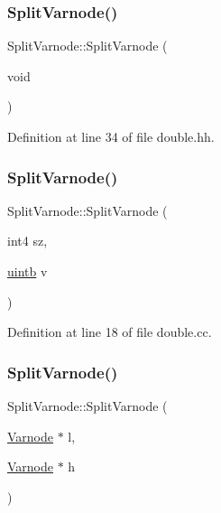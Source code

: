 \subsubsection{\texorpdfstring{SplitVarnode()}{SplitVarnode()}\hspace{0.1cm}{\footnotesize\ttfamily [1/3]}}
{\footnotesize\ttfamily Split\+Varnode\+::\+Split\+Varnode (\begin{DoxyParamCaption}\item[{void}]{ }\end{DoxyParamCaption})\hspace{0.3cm}{\ttfamily [inline]}}



Definition at line 34 of file double.\+hh.

\mbox{\label{class_split_varnode_a1361d18e678130ec7e2c0fffc3e3fa49}} 
\subsubsection{\texorpdfstring{SplitVarnode()}{SplitVarnode()}\hspace{0.1cm}{\footnotesize\ttfamily [2/3]}}
{\footnotesize\ttfamily Split\+Varnode\+::\+Split\+Varnode (\begin{DoxyParamCaption}\item[{int4}]{sz,  }\item[{\mbox{\hyperlink{types_8h_a2db313c5d32a12b01d26ac9b3bca178f}{uintb}}}]{v }\end{DoxyParamCaption})}



Definition at line 18 of file double.\+cc.

\mbox{\label{class_split_varnode_a9a0d2cdc707d94e0fca72a2066593916}} 
\subsubsection{\texorpdfstring{SplitVarnode()}{SplitVarnode()}\hspace{0.1cm}{\footnotesize\ttfamily [3/3]}}
{\footnotesize\ttfamily Split\+Varnode\+::\+Split\+Varnode (\begin{DoxyParamCaption}\item[{\mbox{\hyperlink{class_varnode}{Varnode}} $\ast$}]{l,  }\item[{\mbox{\hyperlink{class_varnode}{Varnode}} $\ast$}]{h }\end{DoxyParamCaption})\hspace{0.3cm}{\ttfamily [inline]}}




